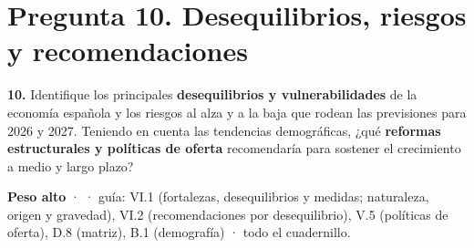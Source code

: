 \section*{Pregunta 10. Desequilibrios, riesgos y recomendaciones}

\begin{enunciado}
\textbf{10.} Identifique los principales \textbf{desequilibrios y vulnerabilidades} de la economía española y los riesgos al alza y a la baja que rodean las previsiones para 2026 y 2027. Teniendo en cuenta las tendencias demográficas, ¿qué \textbf{reformas estructurales y políticas de oferta} recomendaría para sostener el crecimiento a medio y largo plazo?

\smallskip
\textbf{Peso alto} ·  · guía: VI.1 (fortalezas, desequilibrios y medidas; naturaleza, origen y gravedad), VI.2 (recomendaciones por desequilibrio), V.5 (políticas de oferta), D.8 (matriz), B.1 (demografía) · todo el cuadernillo.
\end{enunciado}

